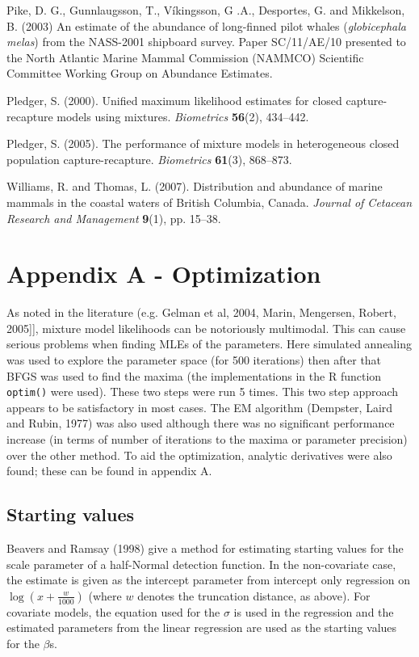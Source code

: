 \documentclass[useAMS,referee, usegraphicx]{biom}
\begin{document}
\begin{thebibliography}{}
\bibitem{ } Pike, D. G., Gunnlaugsson, T., V\'{i}kingsson, G .A., Desportes, G. and Mikkelson, B.  (2003) An estimate of the abundance of long-finned pilot whales (\textit{globicephala melas}) from the NASS-2001 shipboard survey. Paper SC/11/AE/10 presented to the North Atlantic Marine Mammal Commission (NAMMCO) Scientific Committee Working Group on Abundance Estimates.

\bibitem{ } Pledger, S. (2000). Unified maximum likelihood estimates for closed capture-recapture models using mixtures. \textit{Biometrics} \textbf{56}(2), 434--442. 

\bibitem{ } Pledger, S. (2005). The performance of mixture models in heterogeneous closed population capture-recapture. \textit{Biometrics} \textbf{61}(3), 868--873.

\bibitem{ } Williams, R. and Thomas, L. (2007). Distribution and abundance of marine mammals in the coastal waters of British Columbia, Canada. \textit{Journal of Cetacean Research and Management} \textbf{9}(1), pp. 15--38.

\end{thebibliography}


\section*{Appendix A - Optimization}
\label{s:optimization}

As noted in the literature (e.g. Gelman et al, 2004, Marin, Mengersen, Robert, 2005]], mixture model likelihoods can be notoriously multimodal. This can cause serious problems when finding MLEs of the parameters. Here simulated annealing was used to explore the parameter space (for 500 iterations) then after that BFGS was used to find the maxima (the implementations in the \textsf{R} function \texttt{optim()} were used). These two steps were run 5 times. This two step approach appears to be satisfactory in most cases. The EM algorithm (Dempster, Laird and Rubin, 1977) was also used although there was no significant performance increase (in terms of number of iterations to the maxima or parameter precision) over the other method. To aid the optimization, analytic derivatives were also found; these can be found in appendix A.

\subsection{Starting values}
Beavers and Ramsay (1998) give a method for estimating starting values for the scale parameter of a half-Normal detection function. In the non-covariate case, the estimate is given as the intercept parameter from intercept only regression on $\log(x+\frac{w}{1000})$ (where $w$ denotes the truncation distance, as above). For covariate models, the equation used for the $\sigma$ is used in the regression and the estimated parameters from the linear regression are used as the starting values for the $\beta$s.
\end{document}

